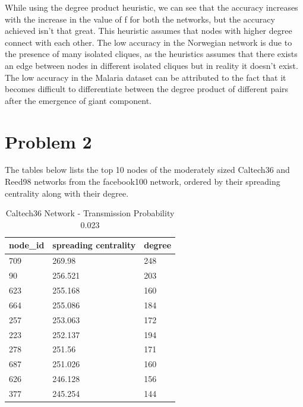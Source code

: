 \documentclass{article}
\begin{document}
\begin{enumerate}[label=(\alph*)]
While using the degree product heuristic, we can see that the accuracy increases with the increase in the value of f for both the networks, but the accuracy achieved isn't that great. This heuristic assumes that nodes with higher degree connect with each other. The low accuracy in the Norwegian network is due to the presence of many isolated cliques, as the heuristics assumes that there exists an edge between nodes in different isolated cliques but in reality it doesn't exist. The low accuracy in the Malaria dataset can be attributed to the fact that it becomes difficult to differentiate between the degree product of different pairs after the emergence of giant component.

\end{enumerate}  
\newpage  	
\section*{Problem 2}
The tables below lists the top 10 nodes of the moderately sized Caltech36 and Reed98 networks from the facebook100 network, ordered by their spreading centrality along with their degree.

\begin{table}[H]
\centering
\caption{Caltech36 Network - Transmission Probability 0.023}
\label{Caltech36}
\begin{tabular}{|l|l|l|}
\hline
node\_id & spreading centrality & degree \\
\hline
709      & 269.98               & 248    \\
90       & 256.521              & 203    \\
623      & 255.168              & 160    \\
664      & 255.086              & 184    \\
257      & 253.063              & 172    \\
223      & 252.137              & 194    \\
278      & 251.56               & 171    \\
687      & 251.026              & 160    \\
626      & 246.128              & 156    \\
377		 & 245.254	           & 144    \\
\hline
\end{tabular}
\end{table} 
\end{document}
